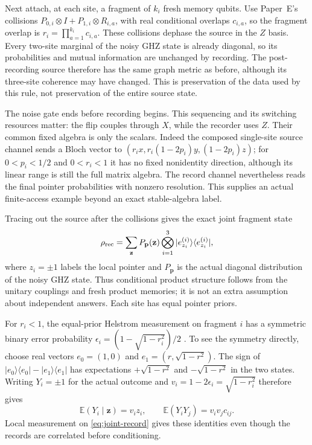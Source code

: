 \documentclass[12pt,a4paper]{article}
\begin{document}
Next attach, at each site, a fragment of $k_i$ fresh memory qubits.
Use Paper~E's collisions
$P_{0,i}\otimes I+P_{1,i}\otimes R_{i,a}$, with real conditional
overlaps $c_{i,a}$, so the fragment overlap is
$r_i=\prod_{a=1}^{k_i}c_{i,a}$. These collisions dephase the source in
the $Z$ basis. Every two-site marginal of the noisy GHZ state is
already diagonal, so its probabilities and mutual information are
unchanged by recording. The post-recording source therefore has the
same graph metric as before, although its three-site coherence may
have changed. This is preservation of the data used by this rule,
not preservation of the entire source state.

The noise gate ends before recording begins. This sequencing and its
switching resources matter: the flip couples through $X$, while the
recorder uses $Z$. Their common fixed algebra is only the scalars.
Indeed the composed single-site source channel sends a Bloch vector to
$(r_i x,r_i(1-2p_i)y,(1-2p_i)z)$; for $0<p_i<1/2$ and $0<r_i<1$
it has no fixed nonidentity direction, although its linear range is
still the full matrix algebra. The record channel nevertheless reads
the final pointer probabilities with nonzero resolution. This supplies
an actual finite-access example beyond an exact stable-algebra label.

Tracing out the source after the collisions gives the exact joint
fragment state
\begin{equation}
\rho_{\rm rec}
 =\sum_{\mathbf z}P_{\mathbf p}(\mathbf z)
       \bigotimes_{i=1}^3 |e_{z_i}^{(i)}\rangle
                         \langle e_{z_i}^{(i)}|,
\label{eq:joint-record}
\end{equation}
where $z_i=\pm1$ labels the local pointer and
$P_{\mathbf p}$ is the actual diagonal distribution of the noisy GHZ
state. Thus conditional product structure follows from the unitary
couplings and fresh product memories; it is not an extra assumption
about independent answers. Each site has equal pointer priors.

For $r_i<1$, the equal-prior Helstrom measurement on fragment $i$
has a symmetric binary error probability
$\epsilon_i=(1-\sqrt{1-r_i^2})/2$ \cite{Helstrom1976,Liu2026PaperE}.
To see the symmetry directly, choose real vectors
$e_0=(1,0)$ and $e_1=(r,\sqrt{1-r^2})$. The sign of
$|e_0\rangle\langle e_0|-|e_1\rangle\langle e_1|$ has expectations
$+\sqrt{1-r^2}$ and $-\sqrt{1-r^2}$ in the two states.
Writing $Y_i=\pm1$ for the actual outcome and
$v_i=1-2\epsilon_i=\sqrt{1-r_i^2}$ therefore gives
\begin{equation}
\mathbb E(Y_i\mid\mathbf z)=v_i z_i,\qquad
\mathbb E(Y_iY_j)=v_iv_jc_{ij}.
\label{eq:record-correlations}
\end{equation}
Local measurement on \eqref{eq:joint-record} gives these identities
even though the records are correlated before conditioning.
\end{document}
